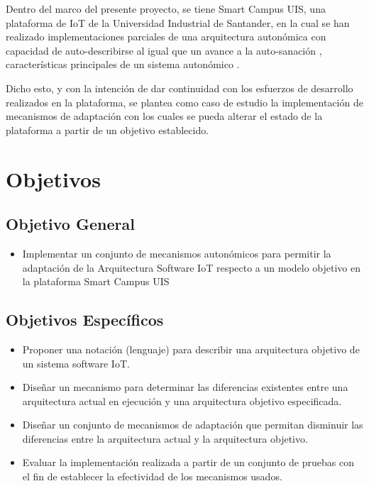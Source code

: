 \documentclass[12pt]{article}
\begin{document}
    Dentro del marco del presente proyecto, se tiene Smart Campus UIS, una plataforma de IoT de la Universidad Industrial de Santander, en la cual se han realizado implementaciones parciales de una arquitectura autonómica con capacidad de auto-describirse al igual que un avance a la auto-sanación \cite{henry_2020}, características principales de un sistema autonómico \cite{horn_2001}. 
    
    Dicho esto, y con la intención de dar continuidad con los esfuerzos de desarrollo realizados en la plataforma, se plantea como caso de estudio la implementación de mecanismos de adaptación con los cuales se pueda alterar el estado de la plataforma a partir de un objetivo establecido.  


    \section{Objetivos}
    \subsection{Objetivo General}
    \begin{itemize}

        \item Implementar un conjunto de mecanismos autonómicos para permitir la adaptación de la Arquitectura Software IoT respecto a un modelo objetivo en la plataforma Smart Campus UIS

    \end{itemize}

    \subsection{Objetivos Específicos}

    \begin{itemize}
        \item Proponer una notación (lenguaje) para describir una arquitectura objetivo de un sistema software IoT.
        \item Diseñar un mecanismo para determinar las diferencias existentes entre una arquitectura actual en ejecución y una arquitectura objetivo especificada.
        \item Diseñar un conjunto de mecanismos de adaptación que permitan disminuir las diferencias entre la arquitectura actual y la arquitectura objetivo.
        \item Evaluar la implementación realizada a partir de un conjunto de pruebas con el fin de establecer la efectividad de los mecanismos usados.

    \end{itemize}
\end{document}
